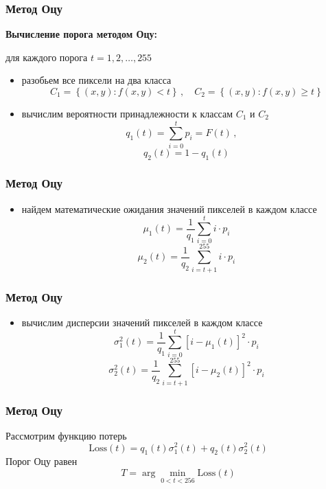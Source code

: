 \documentclass[12pt,usepdftitle=false,aspectratio=1610]{beamer}
\begin{document}
\begin{frame}
\frametitle{Метод Оцу}

\textbf{Вычисление порога методом Оцу:} 
\medskip

для каждого порога $t=1,2,\ldots,255$
\medskip

\begin{itemize}
    \item разобьем все пиксели на два класса
    $$
        C_1 = \left\{(x,y): f(x,y) < t\right\}\,,\quad
        C_2 = \left\{(x,y): f(x,y) \geqslant t\right\}
    $$
    \item вычислим вероятности принадлежности к классам $C_1$ и $C_2$
    $$
        q_1(t) = \sum_{i=0}^t p_{i}=F(t)\,,\quad
    $$
    $$
        q_2(t) =1-q_1(t)
    $$
\end{itemize}
\end{frame}

\begin{frame}
\frametitle{Метод Оцу}
\begin{itemize}
    \item найдем математические ожидания значений пикселей в каждом классе
    $$
        \mu_1(t)=\frac{1}{q_1}\sum_{i=0}^t i \cdot p_{i}
    $$
    $$
        \mu_2(t)=\frac{1}{q_2}\sum_{i=t+1}^{255} i \cdot p_{i}
    $$
\end{itemize}
\end{frame}

\begin{frame}
\frametitle{Метод Оцу}
\begin{itemize}
    \item вычислим дисперсии значений пикселей в каждом классе
    $$
        \sigma_1^2(t)=\frac{1}{q_1}\sum_{i=0}^t [i-\mu_1(t)]^2 \cdot p_{i}
    $$
    $$
        \sigma_2^2(t)=\frac{1}{q_2}\sum_{i=t+1}^{255} [i-\mu_2(t)]^2 \cdot p_{i}
    $$
\end{itemize}
\end{frame}

\begin{frame}
\frametitle{Метод Оцу}
Рассмотрим функцию потерь
$$
    \mbox{Loss}(t)=q_1(t)\sigma_1^2(t)  + q_2(t)\sigma_2^2(t)
$$
Порог Оцу равен
   $$
    T=\arg\min_{0 < t < 256} \mbox{Loss}(t)
   $$
\end{frame}
\end{document}
